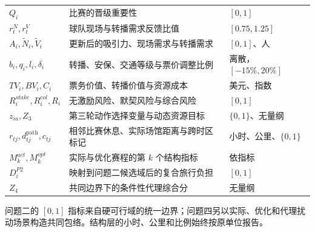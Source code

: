 {\begin{longtable}{>{\centering\arraybackslash}p{}>{\raggedright\arraybackslash}p{}>{\centering\arraybackslash}p{}}
$Q_i$ & 比赛的晋级重要性 & $[0,1]$ \\
$r_t^N,r_t^V$ & 球队现场与转播需求反馈比值 & $[0.75,1.25]$ \\
$A_i,\widetilde N_i,\widetilde V_i$ & 更新后的吸引力、现场需求与转播需求 & $[0,1]$、人 \\
$b_i,q_i,l_i,\delta_i$ & 转播、安保、交通等级与票价调整比例 & 离散，$[-15\%,20\%]$ \\
$TV_i,BV_i,C_i$ & 票务价值、转播价值与资源成本 & 美元、指数 \\
$R_i^{stake},R_i^{col},R_i$ & 无激励风险、默契风险与综合风险 & $[0,1]$ \\
$z_{ia},Z_3$ & 第三轮动作选择变量与动态资源目标 & $\{0,1\}$、无量纲 \\
$r_{tj},d_{tj}^{\mathrm{path}},c_{tj}$ & 相邻比赛休息、实际场馆距离与跨时区标记 & 小时、公里、$\{0,1\}$ \\
$M_k^{act},M_k^{opt}$ & 实际与优化赛程的第 $k$ 个结构指标 & 依指标 \\
$D_i^{P2}$ & 映射到问题二候选域后的复合旅行负担 & $[0,1]$ \\
$Z_4$ & 共同边界下的条件性代理综合分 & 无量纲 \\
\end{longtable}
}

问题二的 $[0,1]$ 指标来自硬可行域的统一边界；问题四另以实际、优化和代理扰动场景构造共同包络。结构层的小时、公里和比例始终按原单位报告。
